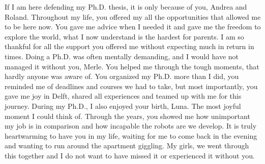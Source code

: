 If I am here defending my Ph.D. thesis, it is only because of you, Andrea and
Roland. Throughout my life, you offered my all the opportunities that allowed
me to be here now. You gave me advice when I needed it and gave me the freedom
to explore the world, what I now understand is the hardest for parents. I am so
thankful for all the support you offered me without expecting much in return in
times. Doing a Ph.D. was often mentally demanding, and I would have not managed
it without you, Merle. You helped me through the tough moments, that hardly
anyone was aware of. You organized my Ph.D. more than I did, you reminded me of
deadlines and courses we had to take, but most importantly, you gave me joy in
Delft, shared all experiences and teamed up with me for this journey. During my
Ph.D., I also enjoyed your birth, Luna. The most joyful moment I could think
of. Through the years, you showed me how unimportant my job is in comparison
and how incapable the robots are we develop. It is truly heartwarming to have
you in my life, waiting for me to come back in the evening and wanting to run
around the apartment giggling. My girls, we went through this together and I
do not want to have missed it or experienced it without you. 






